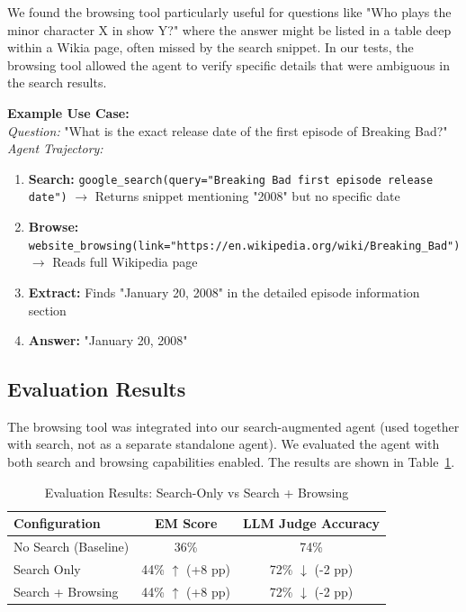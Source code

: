 \documentclass{article}
\begin{document}
We found the browsing tool particularly useful for questions like "Who plays the minor character X in show Y?" where the answer might be listed in a table deep within a Wikia page, often missed by the search snippet. In our tests, the browsing tool allowed the agent to verify specific details that were ambiguous in the search results.

\textbf{Example Use Case:} \\
\textit{Question:} "What is the exact release date of the first episode of Breaking Bad?" \\
\textit{Agent Trajectory:}
\begin{enumerate}
    \item \textbf{Search:} \texttt{google\_search(query="Breaking Bad first episode release date")} $\rightarrow$ Returns snippet mentioning "2008" but no specific date
    \item \textbf{Browse:} \texttt{website\_browsing(link="https://en.wikipedia.org/wiki/Breaking\_Bad")} $\rightarrow$ Reads full Wikipedia page
    \item \textbf{Extract:} Finds "January 20, 2008" in the detailed episode information section
    \item \textbf{Answer:} "January 20, 2008"
\end{enumerate}

\subsection{Evaluation Results}

The browsing tool was integrated into our search-augmented agent (used together with search, not as a separate standalone agent). We evaluated the agent with both search and browsing capabilities enabled. The results are shown in Table~\ref{tab:browsing_results}.

\begin{table}[H]
\centering
\caption{Evaluation Results: Search-Only vs Search + Browsing}
\label{tab:browsing_results}
\begin{tabular}{lcc}
\toprule
\textbf{Configuration} & \textbf{EM Score} & \textbf{LLM Judge Accuracy} \\
\midrule
No Search (Baseline) & 36\% & 74\% \\
Search Only & 44\% $\uparrow$ (+8 pp) & 72\% $\downarrow$ (-2 pp) \\
Search + Browsing & 44\% $\uparrow$ (+8 pp) & 72\% $\downarrow$ (-2 pp) \\
\bottomrule
\end{tabular}
\end{table}
\end{document}
